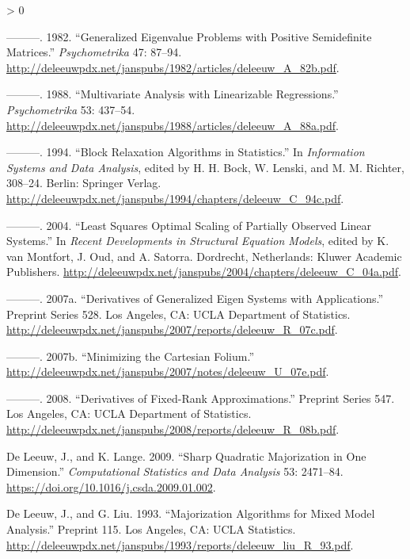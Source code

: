 \documentclass[
  12pt,
]{book}
\newlength{\cslhangindent}
\newenvironment{CSLReferences}[2] %
 {%
  \setlength{\parindent}{0pt}
  \ifodd #1 \everypar{\setlength{\hangindent}{\cslhangindent}}\ignorespaces\fi
  \ifnum #2 > 0
  \setlength{\parskip}{#2\baselineskip}
  \fi
 }%
 {}
\begin{document}
\begin{CSLReferences}{1}{0}
\leavevmode\hypertarget{ref-deleeuw_A_82b}{}%
---------. 1982. {``{Generalized Eigenvalue Problems with Positive Semidefinite Matrices}.''} \emph{Psychometrika} 47: 87--94. \url{http://deleeuwpdx.net/janspubs/1982/articles/deleeuw_A_82b.pdf}.

\leavevmode\hypertarget{ref-deleeuw_A_88a}{}%
---------. 1988. {``Multivariate Analysis with Linearizable Regressions.''} \emph{Psychometrika} 53: 437--54. \url{http://deleeuwpdx.net/janspubs/1988/articles/deleeuw_A_88a.pdf}.

\leavevmode\hypertarget{ref-deleeuw_C_94c}{}%
---------. 1994. {``{Block Relaxation Algorithms in Statistics}.''} In \emph{Information Systems and Data Analysis}, edited by H. H. Bock, W. Lenski, and M. M. Richter, 308--24. Berlin: Springer Verlag. \url{http://deleeuwpdx.net/janspubs/1994/chapters/deleeuw_C_94c.pdf}.

\leavevmode\hypertarget{ref-deleeuw_C_04a}{}%
---------. 2004. {``Least Squares Optimal Scaling of Partially Observed Linear Systems.''} In \emph{Recent Developments in Structural Equation Models}, edited by K. van Montfort, J. Oud, and A. Satorra. Dordrecht, Netherlands: Kluwer Academic Publishers. \url{http://deleeuwpdx.net/janspubs/2004/chapters/deleeuw_C_04a.pdf}.

\leavevmode\hypertarget{ref-deleeuw_R_07c}{}%
---------. 2007a. {``Derivatives of Generalized Eigen Systems with Applications.''} Preprint Series 528. Los Angeles, CA: UCLA Department of Statistics. \url{http://deleeuwpdx.net/janspubs/2007/reports/deleeuw_R_07c.pdf}.

\leavevmode\hypertarget{ref-deleeuw_U_07e}{}%
---------. 2007b. {``{Minimizing the Cartesian Folium}.''} \url{http://deleeuwpdx.net/janspubs/2007/notes/deleeuw_U_07e.pdf}.

\leavevmode\hypertarget{ref-deleeuw_R_08b}{}%
---------. 2008. {``{Derivatives of Fixed-Rank Approximations}.''} Preprint Series 547. Los Angeles, CA: UCLA Department of Statistics. \url{http://deleeuwpdx.net/janspubs/2008/reports/deleeuw_R_08b.pdf}.

\leavevmode\hypertarget{ref-deleeuw_lange_A_09}{}%
De Leeuw, J., and K. Lange. 2009. {``Sharp Quadratic Majorization in One Dimension.''} \emph{Computational Statistics and Data Analysis} 53: 2471--84. \url{https://doi.org/10.1016/j.csda.2009.01.002}.

\leavevmode\hypertarget{ref-deleeuw_liu_R_93}{}%
De Leeuw, J., and G. Liu. 1993. {``Majorization Algorithms for Mixed Model Analysis.''} Preprint 115. Los Angeles, CA: UCLA Statistics. \url{http://deleeuwpdx.net/janspubs/1993/reports/deleeuw_liu_R_93.pdf}.


\end{CSLReferences}
\end{document}
